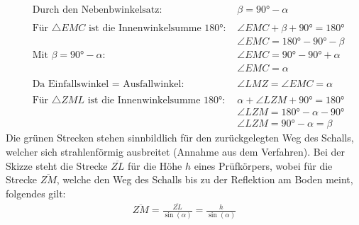 \documentclass[a4paper,10pt,ngerman]{scrartcl}
\begin{document}
\begin{align*}
  &\text{Durch den Nebenbwinkelsatz: } &\beta = 90\text{°}-\alpha \\ \\
  &\text{Für } \triangle EMC \text{ ist die Innenwinkelsumme 180°: } &\angle EMC+\beta+90\text{°} = 180\text{°} \\
  &&\angle EMC = 180\text{°} - 90\text{°} - \beta \\
  &\text{Mit } \beta=90\text{°}-\alpha \text{:}&\angle EMC = 90\text{°}-90\text{°}+\alpha \\
  && \angle EMC = \alpha \\ \\
  &\text{Da Einfallswinkel $=$ Ausfallwinkel:} & \angle LMZ=\angle EMC=\alpha \\ \\
  &\text{Für } \triangle ZML \text{ ist die Innenwinkelsumme 180°: } &\alpha+\angle LZM+90\text{°} = 180\text{°} \\
  && \angle LZM = 180\text{°} - \alpha - 90\text{°} \\
  && \angle LZM = 90\text{°} - \alpha=\beta
\end{align*}
Die grünen Strecken stehen sinnbildlich für den zurückgelegten Weg des Schalls, welcher sich 
strahlenförmig ausbreitet (Annahme aus dem Verfahren). Bei der Skizze steht die Strecke $\overline{ZL}$ 
für die Höhe $h$ eines Prüfkörpers, wobei für die Strecke $\overline{ZM}$, welche den Weg des Schalls bis 
zu der Reflektion am Boden meint, folgendes gilt: \\
\begin{align*}
  \overline{ZM} = \frac{\overline{ZL}}{\sin(\alpha)} = \frac{h}{\sin(\alpha)}
\end{align*}
\end{document}
